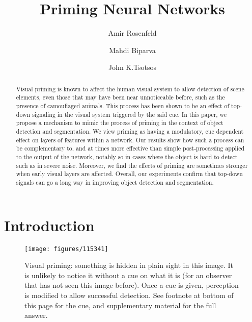 \documentclass[10pt,letterpaper,twocolumn]{article}
\begin{document}
\title{Priming Neural Networks}
\author[ ]{Amir Rosenfeld}
\author[ ]{Mahdi Biparva}
\author[ ]{John K.Tsotsos}


\maketitle
\begin{abstract}
Visual priming is known to affect the human visual system to allow
detection of scene elements, even those that may have been near unnoticeable
before, such as the presence of camouflaged animals. This process
has been shown to be an effect of top-down signaling in the visual
system triggered by the said cue. In this paper, we propose a mechanism
to mimic the process of priming in the context of object detection
and segmentation. We view priming as having a modulatory, cue dependent
effect on layers of features within a network. Our results show how
such a process can be complementary to, and at times more effective
than simple post-processing applied to the output of the network,
notably so in cases where the object is hard to detect such as in
severe noise. Moreover, we find the effects of priming are sometimes
stronger when early visual layers are affected. Overall, our experiments
confirm that top-down signals can go a long way in improving object
detection and segmentation.
\end{abstract}

\section{Introduction}

\begin{figure}
\begin{centering}
\texttt{[image: figures/115341]}
\par\end{centering}
\caption{\label{fig:Visual-priming}Visual priming: something is hidden in
plain sight in this image. It is unlikely to notice it without a cue
on what it is (for an observer that has not seen this image before).
Once a cue is given, perception is modified to allow successful detection.
See footnote at bottom of this page for the cue, and supplementary
material for the full answer.}
\end{figure}
\end{document}
